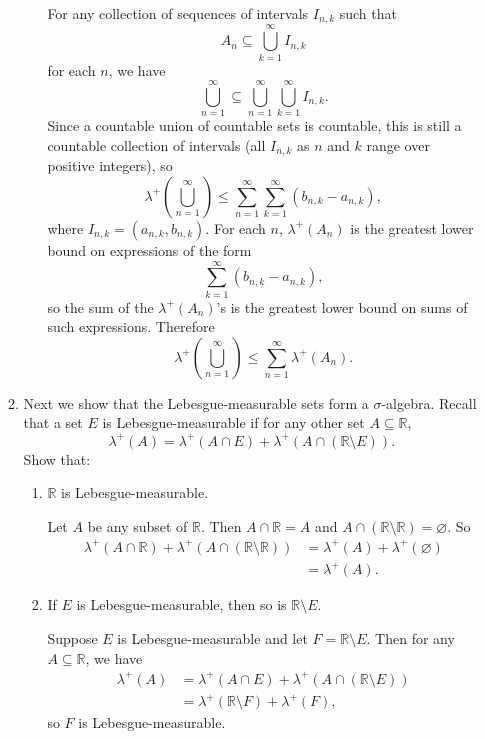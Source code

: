 \documentclass{article}
\let\take\setminus
\begin{document}
\begin{enumerate}
\begin{enumerate}
\begin{enumerate}
						{\color{blue}
							For any collection of sequences of intervals $I_{n,k}$ such that
							\[A_n\subseteq \bigcup_{k=1}^\infty I_{n,k}\]
							for each $n$, we have
							\[\bigcup_{n=1}^\infty \subseteq \bigcup_{n=1}^\infty\bigcup_{k=1}^\infty I_{n,k}.\]
							Since a countable union of countable sets is countable, this is still a countable collection of intervals (all $I_{n,k}$ as $n$ and $k$ range over positive integers), so
							\[\lambda^+\left(\bigcup_{n=1}^\infty\right) \leq \sum_{n=1}^\infty \sum_{k=1}^\infty (b_{n,k}-a_{n,k}),\]
							where $I_{n,k}=(a_{n,k},b_{n,k})$. For each $n$, $\lambda^+(A_n)$ is the greatest lower bound on expressions of the form
							\[\sum_{k=1}^\infty (b_{n,k}-a_{n,k}),\]
							so the sum of the $\lambda^+(A_n)$'s is the greatest lower bound on sums of such expressions. Therefore
							\[\lambda^+\left(\bigcup_{n=1}^\infty\right)\leq \sum_{n=1}^\infty \lambda^+(A_n).\]
						}
						
				\end{enumerate}
			\item Next we show that the Lebesgue-measurable sets form a $\sigma$-algebra. Recall that a set $E$ is Lebesgue-measurable if for any other set $A\subseteq \mathbb{R}$,
				\[\lambda^+(A)=\lambda^+\left(A\cap E\right) + \lambda^+\left(A\cap (\mathbb{R}\take E)\right).\]
				Show that:
				\begin{enumerate}
					\item $\mathbb{R}$ is Lebesgue-measurable.
					
						{\color{blue}
							Let $A$ be any subset of $\mathbb{R}$. Then $A\cap \mathbb{R}=A$ and $A\cap (\mathbb{R}\take\mathbb{R})=\varnothing$. So
							\begin{align*}
								\lambda^+(A\cap \mathbb{R})+\lambda^+(A\cap(\mathbb{R}\take\mathbb{R}))&=\lambda^+(A)+\lambda^+(\varnothing)\\
								&=\lambda^+(A).
							\end{align*}
						}
					
					\item If $E$ is Lebesgue-measurable, then so is $\mathbb{R}\take E$.
					
						{\color{blue}
							Suppose $E$ is Lebesgue-measurable and let $F=\mathbb{R}\take E$. Then for any $A\subseteq \mathbb{R}$, we have
							\begin{align*}
								\lambda^+(A)&=\lambda^+(A\cap E)+\lambda^+(A\cap(\mathbb{R}\take E))\\
								&=\lambda^+(\mathbb{R}\take F)+\lambda^+(F),
							\end{align*}
							so $F$ is Lebesgue-measurable.
						}
					

\end{enumerate}
\end{enumerate}
\end{enumerate}
\end{document}
